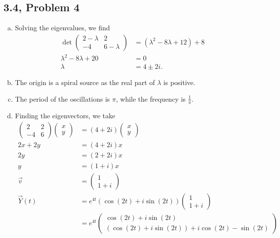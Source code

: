 \documentclass[10pt]{mypackage}
\begin{document}
\subsection{3.4, Problem 4}%
\begin{enumerate}[(a)]
  \item Solving the eigenvalues, we find
    \begin{align*}
      \det \begin{pmatrix}2-\lambda & 2 \\ -4 & 6-\lambda\end{pmatrix} &= \left(\lambda^2 - 8 \lambda + 12\right) + 8\\
      \lambda^2 - 8\lambda + 20 &= 0\\
      \lambda &= 4 \pm 2i.
    \end{align*}
  \item The origin is a spiral source as the real part of $\lambda$ is positive.
  \item The period of the oscillations is $\pi$, while the frequency is $\frac{1}{\pi}$.
  \item Finding the eigenvectors, we take
    \begin{align*}
      \begin{pmatrix}2 & 2 \\ -4 & 6\end{pmatrix} \begin{pmatrix}x\\y\end{pmatrix} &= \left(4+2i\right) \begin{pmatrix}x\\y\end{pmatrix}\\
      2x + 2y &= \left(4+2i\right)x\\
      2y &= \left(2+2i\right)x\\
      y &= \left(1+i\right)x\\
      \vec{v} &= \begin{pmatrix}1\\1+i\end{pmatrix}\\
      \vec{Y}(t) &= e^{4t}\left(\cos\left(2t\right) + i\sin\left(2t\right)\right) \begin{pmatrix}1\\1+i\end{pmatrix}\\
                 &= e^{4t} \begin{pmatrix}\cos\left(2t\right) + i\sin\left(2t\right) \\ \left(\cos\left(2t\right) + i\sin\left(2t\right)\right) + i\cos\left(2t\right) - \sin\left(2t\right)\end{pmatrix}\\

\end{align*}
\end{enumerate}
\end{document}
